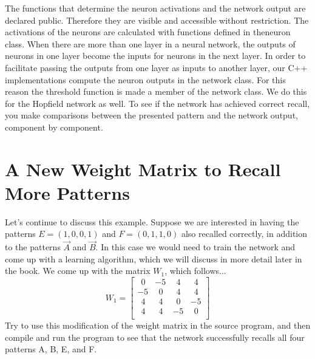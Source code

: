 \documentclass[12pt, right open]{memoir}
\newcommand{\matplus}
{
~~
}
\begin{document}
The functions that determine the neuron activations and the network output are
declared public. Therefore they are visible and accessible without restriction.
The activations of the neurons are calculated with functions defined in theneuron class. When there are more than one layer in a neural network, the
outputs of neurons in one layer become the inputs for neurons in the next
layer. In order to facilitate passing the outputs from one layer as inputs to
another layer, our C++ implementations compute the neuron outputs in the
network class. For this reason the threshold function is made a member of the
network class. We do this for the Hopfield network as well. To see if the
network has achieved correct recall, you make comparisons between the
presented pattern and the network output, component by component.

\section{A New Weight Matrix to Recall More Patterns}
Let’s continue to discuss this example. Suppose we are interested in having the
patterns $E = (1, 0, 0, 1)$ and $F = (0, 1, 1, 0)$ also recalled correctly, in addition
to the patterns $\vec{A}$ and $\vec{B}$. In this case we would need to train the network and
come up with a learning algorithm, which we will discuss in more detail later
in the book. We come up with the matrix $W_1$, which follows...
\[ 
W_1 = \begin{bmatrix}
 \matplus0 & -5 &  \matplus4 & \matplus4 \\
-5 &  \matplus0 &  \matplus4 & \matplus4 \\
 \matplus4 &  \matplus4 &  \matplus0 & -5 \\
 \matplus4 &  \matplus4 & -5 &  \matplus0 \\
\end{bmatrix}
\]
Try to use this modification of the weight matrix in the source program, and
then compile and run the program to see that the network successfully recalls
all four patterns A, B, E, and F.

\end{document}
